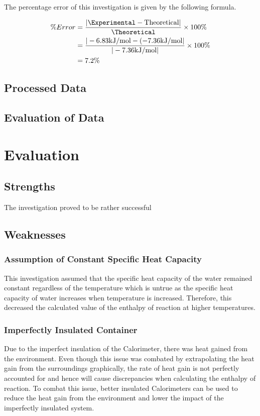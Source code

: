\documentclass{article}
\begin{document}
The percentage error of this investigation is given by the following formula.
\begin{tcolorbox}[title=Calculation of Percentage Error ($\mathrm{\% Error}$)]
\begin{equation}
    \begin{split}
    \% Error &= \frac{\mathrm{|\Experimental - Theoretical|}}{\mathrm{\Theoretical}} \times 100 \% \\
    &= \frac{|-6.83 \mathrm{kJ/mol} - (-7.36 \mathrm{kJ/mol}|}{|-7.36 \mathrm{kJ/mol}|} \times 100 \% \\
    &= 7.2 \%
    \end{split}
\end{equation}
\end{tcolorbox}

\subsection{Processed Data}

\subsection{Evaluation of Data}

\section{Evaluation}
\subsection{Strengths}
The investigation proved to be rather successful 

\subsection{Weaknesses} 
\subsubsection{Assumption of Constant Specific Heat Capacity} \label{subsection1}
This investigation assumed that the specific heat capacity of the water remained constant regardless of the temperature which is untrue as the specific heat capacity of water increases when temperature is increased. Therefore, this decreased the calculated value of the enthalpy of reaction at higher temperatures.

\subsubsection{Imperfectly Insulated Container}
Due to the imperfect insulation of the Calorimeter, there was heat gained from the environment. Even though this issue was combated by extrapolating the heat gain from the surroundings graphically, the rate of heat gain is not perfectly accounted for and hence will cause discrepancies when calculating the enthalpy of reaction. To combat this issue, better insulated Calorimeters can be used to reduce the heat gain from the environment and lower the impact of the imperfectly insulated system. 
\end{document}
